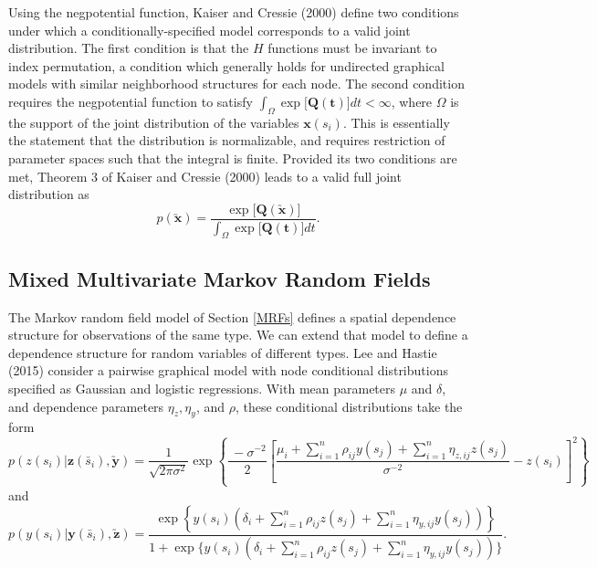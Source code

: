 \documentclass[12pt, a4paper, twoside]{article}
\begin{document}
Using the negpotential function, Kaiser and Cressie (2000) define two conditions under which a conditionally-specified model corresponds to a valid joint distribution. The first condition is that the $H$ functions must be invariant to index permutation, a condition which generally holds for undirected graphical models with similar neighborhood structures for each node. The second condition requires the negpotential function to satisfy $\int_{\Omega}\exp\lbrack\mathbf{Q(t)}\rbrack dt < \infty$, where $\Omega$ is the support of the joint distribution of the variables $\boldsymbol{x}(s_i)$. This is essentially the statement that the distribution is normalizable, and requires restriction of parameter spaces such that the integral is finite. Provided its two conditions are met, Theorem 3 of Kaiser and Cressie (2000) leads to a valid full joint distribution as
\begin{equation*}
p(\boldsymbol{\utilde{x}}) = \frac{\exp\lbrack\mathbf{Q(\boldsymbol{\utilde{x}})}\rbrack}
{\int_\Omega \exp\lbrack\mathbf{Q(t)}\rbrack dt} \boldsymbol{.}
\end{equation*}

\subsection{Mixed Multivariate Markov Random Fields} \label{MixedMRF}
The Markov random field model of Section \ref{MRFs} defines a spatial dependence structure for observations of the same type. We can extend that model to define a dependence structure for random variables of different types. Lee and Hastie (2015) consider a pairwise graphical model with node conditional distributions specified as Gaussian and logistic regressions. With mean parameters $\mu$ and $\delta$, and dependence parameters $\eta_z, \eta_y$, and $\rho$, these conditional distributions take the form
\begin{equation} \label{LHz}
 p(z(s_{i}) | \boldsymbol{z}(\bar{s}_i) , \boldsymbol{\utilde{y}}) = \frac{1}{\sqrt {2 \pi \sigma^2}} \exp\left\lbrace \frac{\ -\sigma^{-2}}{2} \left[ \frac{\mu_i + \sum_{i=1}^{n}\rho_{ij}y(s_j) + \sum_{i=1}^{n}\eta_{z,ij}z(s_j)}{\sigma^{-2}} - z(s_i) \right]^{2} \right\rbrace
\end{equation}
and
\begin{equation} \label{LHy}
p(y(s_{i}) | \boldsymbol{y}(\bar{s}_i) , \boldsymbol{\utilde{z}}) = \frac{\exp\left\lbrace y(s_i)\left(\delta_i + \sum_{i=1}^{n}\rho_{ij}z(s_j) +  \sum_{i=1}^{n}\eta_{y,ij}y(s_j) \right)\right\rbrace}
{1 + \exp\lbrace  y(s_i)\left(\delta_i + \sum_{i=1}^{n}\rho_{ij}z(s_j) +  \sum_{i=1}^{n}\eta_{y,ij}y(s_j) \right)\rbrace }  \textbf{.}
\end{equation}
\end{document}
